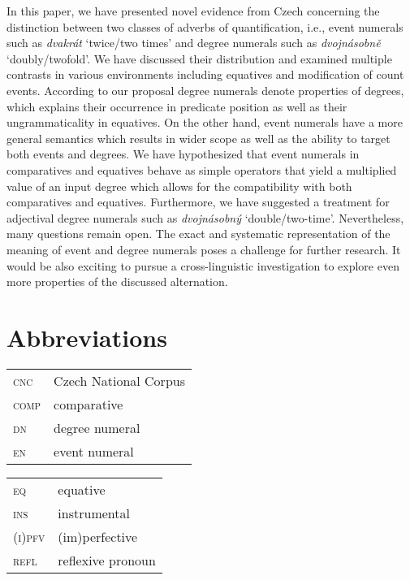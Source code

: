 \documentclass[output=paper,modfonts,hidelinks,newtxmath
\ChapterDOI{10.5281/zenodo.2545513}
]{langscibook}
\begin{document}
In this paper, we have presented novel evidence from Czech concerning the distinction between two classes of adverbs of quantification, i.e., event numerals such as \textit{dvakrát} `twice/two times' and degree numerals such as \textit{dvojnásobně} `doubly/twofold'. We have discussed their distribution and examined multiple contrasts in various environments including equatives and modification of count events. According to our proposal degree numerals denote properties of degrees, which explains their occurrence in predicate position as well as their ungrammaticality in equatives. On the other hand, event numerals have a more general semantics which results in wider scope as well as the ability to target both events and degrees. We have hypothesized that event numerals in comparatives and equatives behave as simple operators that yield a multiplied value of an input degree which allows for the compatibility with both comparatives and equatives. Furthermore, we have suggested a treatment for adjectival degree numerals such as \textit{dvojnásobný} `double/two-time'. Nevertheless, many questions remain open. The exact and systematic representation of the meaning of event and degree numerals poses a challenge for further research. It would be also exciting to pursue a cross-linguistic investigation to explore even more properties of the discussed alternation.

\section*{Abbreviations}

\begin{tabularx}{.5\textwidth}{@{}lQ@{}}
\textsc{cnc}&Czech National Corpus\\
\textsc{comp}&comparative\\
\textsc{dn}&degree numeral\\
\textsc{en}&event numeral\\
\end{tabularx}%
\begin{tabularx}{.5\textwidth}{@{}lQ@{}}
\textsc{eq}&equative\\
\textsc{ins}&instrumental\\
\textsc{(i)pfv}&(im)perfective\\
\textsc{refl}&reflexive pronoun\\
\end{tabularx}
\end{document}
